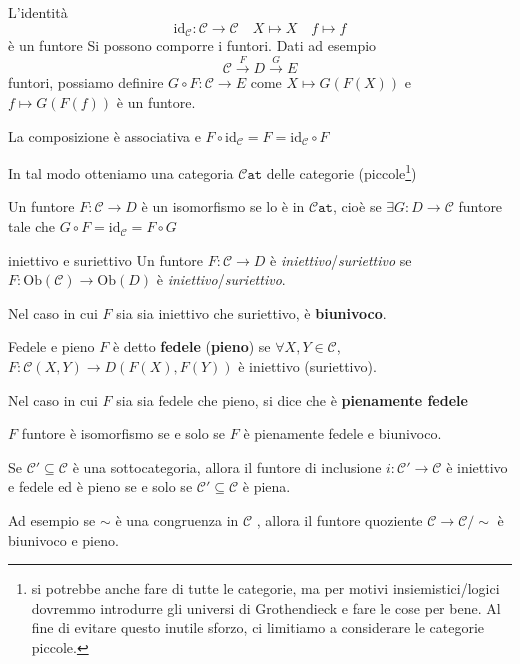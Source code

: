     L'identità
    \[
      \mathrm{id}_\mathcal{C} : \mathcal{C} \to \mathcal{C} \quad X \mapsto X \quad f \mapsto f
    \]
    è un funtore
    Si possono comporre i funtori. Dati ad esempio 
    \[
      \mathcal{C} \overset{F}{\to } D \overset{G}{\to } E
    \]
    funtori, possiamo definire \(G \circ F : \mathcal{C} \to E\) come \(X \mapsto G{(F{(X)})}\)  e \(f \mapsto G{(F{(f)})}\) è un funtore.

    La composizione è associativa  e \(F \circ \mathrm{id}_\mathcal{C} = F = \mathrm{id}_\mathcal{C} \circ F\) 

In tal modo otteniamo una categoria \(\mathtt{\mathcal{C}at}\) delle categorie (piccole\footnote{si potrebbe anche fare di tutte le categorie, ma per motivi
insiemistici/logici dovremmo introdurre gli universi di Grothendieck e fare le
cose per bene. Al fine di evitare questo inutile sforzo, ci limitiamo a
considerare le categorie piccole.})

\begin{definition}{}
    Un funtore \(F : \mathcal{C} \to D\) è un isomorfismo se lo è in \(\mathtt{\mathcal{C}at}\),
    cioè se \(\exists G : D \to \mathcal{C}\)  funtore tale che \(G \circ F = \mathrm{id}_\mathcal{C} = F \circ G\) 
\end{definition}

\begin{definition}{iniettivo e suriettivo}
    Un funtore \(F : \mathcal{C} \to D\) è \emph{iniettivo}/\emph{suriettivo} se \(F : \mathrm{Ob}{(\mathcal{C})} \to \mathrm{Ob}{(D)}\) è \emph{iniettivo}/\emph{suriettivo}.

    Nel caso in cui \(F\) sia sia iniettivo che suriettivo, è \textbf{biunivoco}.
\end{definition}

\begin{definition}{Fedele e pieno}
    \(F\) è detto \textbf{fedele} (\textbf{pieno}) se \(\forall X, Y \in \mathcal{C}\), \(F : \mathcal{C}{(X, Y)} \to D{(F{(X)}, F{(Y)})}\) è iniettivo (suriettivo).

    Nel caso in cui \(F\) sia sia fedele che pieno, si dice che è
    \textbf{pienamente fedele}
\end{definition}
\begin{eser}{}
    \(F\) funtore è isomorfismo se e solo se \(F\) è pienamente fedele e
    biunivoco.
\end{eser}


\begin{example}{}
    Se \(\mathcal{C}' \subseteq \mathcal{C} \) è una sottocategoria, allora il funtore di inclusione
    \(i : \mathcal{C}' \to \mathcal{C}\) è iniettivo e fedele ed è pieno se e solo se \(\mathcal{C}' \subseteq \mathcal{C}\) è piena.

    Ad esempio se \(\sim \) è una congruenza in \(\mathcal{C}\) , allora il funtore
    quoziente \(\mathcal{C} \to \mathcal{C} / \sim \) è biunivoco e pieno.
\end{example}


